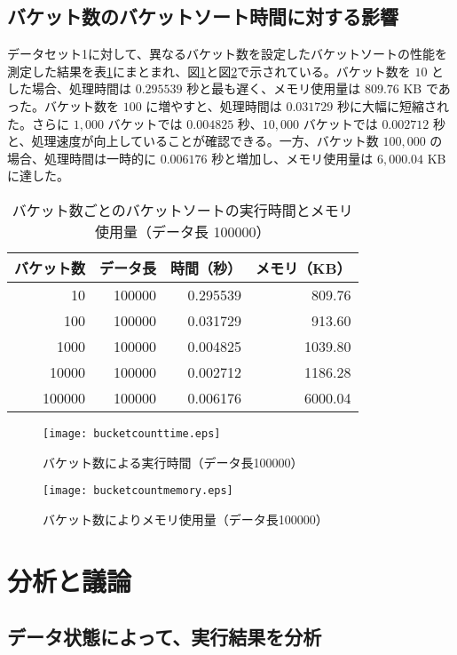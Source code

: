 \documentclass[a4j, 12pt]{jarticle}
\begin{document}
\subsection{バケット数のバケットソート時間に対する影響}
データセット1に対して、異なるバケット数を設定したバケットソートの性能を測定した結果を表\ref{bucketcountresult}にまとまれ、図\ref{bucketcounttimegraph}と図\ref{bucketcountmemorygraph}で示されている。バケット数を $10$ とした場合、処理時間は $0.295539$ 秒と最も遅く、メモリ使用量は $809.76$ KB であった。バケット数を $100$ に増やすと、処理時間は $0.031729$ 秒に大幅に短縮された。さらに $1,000$ バケットでは $0.004825$ 秒、$10,000$ バケットでは $0.002712$ 秒と、処理速度が向上していることが確認できる。一方、バケット数 $100,000$ の場合、処理時間は一時的に $0.006176$ 秒と増加し、メモリ使用量は $6,000.04$ KB に達した。
\begin{table}[H]
  \centering
  \caption{バケット数ごとのバケットソートの実行時間とメモリ使用量（データ長 100000）}\label{bucketcountresult}
  \begin{tabular}{|r|r|r|r|}
    \hline
    \textbf{バケット数} & \textbf{データ長} & \textbf{時間（秒）} & \textbf{メモリ（KB）} \\
    \hline
    10      & 100000 & 0.295539 & 809.76  \\
    100     & 100000 & 0.031729 & 913.60  \\
    1000    & 100000 & 0.004825 & 1039.80 \\
    10000   & 100000 & 0.002712 & 1186.28 \\
    100000  & 100000 & 0.006176 & 6000.04 \\
    \hline
  \end{tabular}
\end{table}
\begin{figure}[H]
  \centering
  \texttt{[image: bucketcounttime.eps]}
  \caption{バケット数による実行時間（データ長100000）}\label{bucketcounttimegraph}
\end{figure}
\begin{figure}[H]
  \centering
  \texttt{[image: bucketcountmemory.eps]}
  \caption{バケット数によりメモリ使用量（データ長100000）}\label{bucketcountmemorygraph}
\end{figure}
\section{分析と議論}
\subsection{データ状態によって、実行結果を分析}
\end{document}

